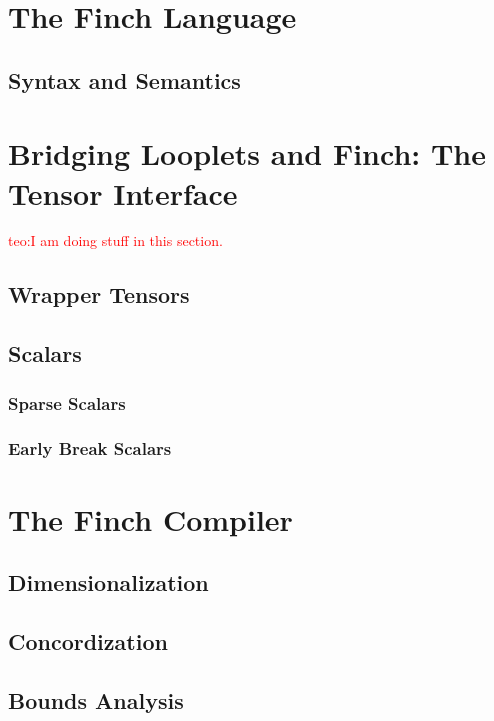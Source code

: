 \documentclass[acmsmall]{acmart}
\newcommand\teo[1]{\textcolor{red}{teo:#1}}
\begin{document}
\section{The Finch Language}

\subsection{Syntax and Semantics}


\section{Bridging Looplets and Finch: The Tensor Interface}
\teo{I am doing stuff in this section.}




\subsection{Wrapper Tensors}

\subsection{Scalars}

\subsubsection{Sparse Scalars}
\subsubsection{Early Break Scalars}


\section{The Finch Compiler}

\subsection{Dimensionalization}

\subsection{Concordization}

\subsection{Bounds Analysis}
\end{document}
